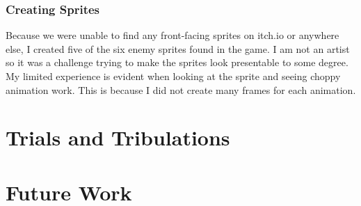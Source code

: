 \documentclass{sigchi}
\begin{document}
\subsubsection*{Creating Sprites}
Because we were unable to find any front-facing sprites on itch.io \cite{itch} or anywhere else, I created five of the six enemy sprites found in the game. I am not an artist so it was a challenge trying to make the sprites look presentable to some degree. My limited experience is evident when looking at the sprite and seeing choppy animation work. This is because I did not create many frames for each animation. 

\section{Trials and Tribulations}

\section{Future Work}
\end{document}
